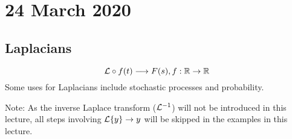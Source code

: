\documentclass[diffeq.tex]{subfiles}
\begin{document}
\chapter{24 March 2020}
    \section{Laplacians}
    \begin{equation}
        \mathcal{L} \circ f(t) \longrightarrow F(s), f : \mathbb{R} \to \mathbb{R}
    \end{equation}
    Some uses for Laplacians include stochastic processes and probability.

    Note: As the inverse Laplace transform ($\mathcal{L}^{-1}$) will not be introduced in this lecture, all steps involving $\mathcal{L}\{y\} \to y$ will be skipped in the examples in this lecture.
\end{document}
